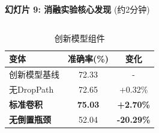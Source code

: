 \documentclass[10pt]{beamer}
\begin{document}
\begin{frame}{\textbf{幻灯片 9: 消融实验核心发现} (约2分钟)}
\begin{columns}[T]
\begin{column}{0.49\textwidth}
        \vspace{0.5em}
        \begin{table}[h]
        \centering
        {\scriptsize
        \begin{tabular}{|l|c|c|}
        \hline
        变体 & 准确率(\%) & 变化 \\
        \hline
        创新模型基线 & 72.33 & - \\
        无DropPath & 72.65 & +0.32\% \\
        \textbf{标准卷积} & \textbf{75.03} & \textbf{+2.70\%} \\
        \textbf{无倒置瓶颈} & 52.04 & \textbf{-20.29\%} \\
        \hline
        \end{tabular}
        \caption{创新模型组件}}
        \end{table}
    \end{column}
\end{columns}

\end{frame}
\end{document}
